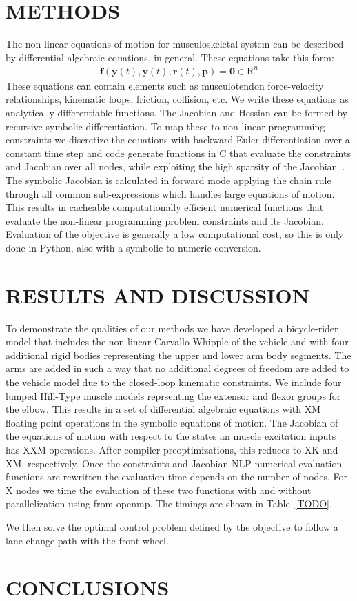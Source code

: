 \documentclass[11pt,twocolumn]{article}
\begin{document}
\section*{METHODS}
%
The non-linear equations of motion for musculoskeletal system can be described
by differential algebraic equations, in general. These equations take this
form:
%
\begin{align}
  \mathbf{f}(\dot{\mathbf{y}}(t), \mathbf{y}(t), \mathbf{r}(t), \mathbf{p}) =
  \mathbf{0} \in \mathrm{R}^n
\end{align}
%
These equations can contain elements such as musculotendon force-velocity
relationships, kinematic loops, friction, collision, etc. We write these
equations as analytically differentiable functions. The Jacobian and Hessian can
be formed by recursive symbolic differentiation. To map these to non-linear
programming constraints we discretize the equations with backward Euler
differentiation over a constant time step and code generate functions in C that
evaluate the constraints and Jacobian over all nodes, while exploiting the high
sparsity of the Jacobian~\cite{Moore2018}. The symbolic Jacobian is calculated
in forward mode applying the chain rule through all common sub-expressions which
handles large equations of motion. This results in cacheable computationally
efficient numerical functions that evaluate the non-linear programming problem
constraints and its Jacobian. Evaluation of the objective is generally a low
computational cost, so this is only done in Python, also with a symbolic to
numeric conversion.

\section*{RESULTS AND DISCUSSION}
%
To demonstrate the qualities of our methods we have developed a bicycle-rider
model that includes the non-linear Carvallo-Whipple of the vehicle and with
four additional rigid bodies representing the upper and lower arm body
segments. The arms are added in such a way that no additional degrees of
freedom are added to the vehicle model due to the closed-loop kinematic
constraints. We include four lumped Hill-Type muscle models reprsenting the
extensor and flexor groups for the elbow. This results in a set of differential
algebraic equations with XM floating point operations in the symbolic equations
of motion. The Jacobian of the equations of motion with respect to the states
an muscle excitation inputs has XXM operations. After compiler
preoptimizations, this reduces to XK and XM, respectively. Once the constraints
and Jacobian NLP numerical evaluation functions are rewritten the evaluation
time depends on the number of nodes. For X nodes we time the evaluation of
these two functions with and without parallelization using from openmp. The
timings are shown in Table~\ref{TODO}.

We then solve the optimal control problem defined by the objective to follow a
lane change path with the front wheel.

\section*{CONCLUSIONS}



\end{document}
